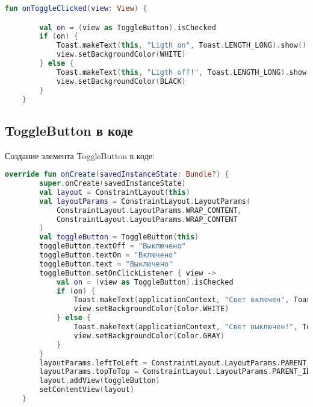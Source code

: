 \begin{lstlisting}[language=Kotlin, caption=\leftline{ToggleButton Kotlin}, label=lst:ToggleButtonKotlin]
fun onToggleClicked(view: View) {

        val on = (view as ToggleButton).isChecked
        if (on) {
            Toast.makeText(this, "Ligth on", Toast.LENGTH_LONG).show()
            view.setBackgroundColor(WHITE)
        } else {
            Toast.makeText(this, "Ligth off!", Toast.LENGTH_LONG).show()
            view.setBackgroundColor(BLACK)
        }
    }
\end{lstlisting}




\subsection{ToggleButton в коде}
Создание элемента ToggleButton в коде:
\begin{lstlisting}[language=Kotlin, caption=\leftline{ToggleButton Kotlin}, label=lst:ToggleButtoninKotlin]
override fun onCreate(savedInstanceState: Bundle?) {
        super.onCreate(savedInstanceState)
        val layout = ConstraintLayout(this)
        val layoutParams = ConstraintLayout.LayoutParams(
            ConstraintLayout.LayoutParams.WRAP_CONTENT,
            ConstraintLayout.LayoutParams.WRAP_CONTENT
        )
        val toggleButton = ToggleButton(this)
        toggleButton.textOff = "Выключено"
        toggleButton.textOn = "Включено"
        toggleButton.text = "Выключено"
        toggleButton.setOnClickListener { view ->
            val on = (view as ToggleButton).isChecked
            if (on) {
                Toast.makeText(applicationContext, "Свет включен", Toast.LENGTH_LONG).show()
                view.setBackgroundColor(Color.WHITE)
            } else {
                Toast.makeText(applicationContext, "Свет выключен!", Toast.LENGTH_LONG).show()
                view.setBackgroundColor(Color.GRAY)
            }
        }
        layoutParams.leftToLeft = ConstraintLayout.LayoutParams.PARENT_ID
        layoutParams.topToTop = ConstraintLayout.LayoutParams.PARENT_ID
        layout.addView(toggleButton)
        setContentView(layout)
    }
\end{lstlisting}
